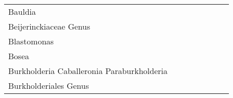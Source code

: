 \documentclass[
]{article}
\begin{document}
\begin{longtable}{@{\extracolsep{\fill}}lrrrrrrr}
Bauldia & \cellcolor[HTML]{FFF8F5}{\textcolor[HTML]{000000}{\textbf{+}}} & \cellcolor[HTML]{F2F2F2}{\textcolor[HTML]{000000}{}} & \cellcolor[HTML]{FFFFFF}{\textcolor[HTML]{000000}{\textbf{+}}} & \cellcolor[HTML]{D2B6FF}{\textcolor[HTML]{000000}{\textbf{-}}} & \cellcolor[HTML]{FFEBE4}{\textcolor[HTML]{000000}{\textbf{+}}} & \cellcolor[HTML]{FFD6C8}{\textcolor[HTML]{000000}{\textbf{+}}} & \cellcolor[HTML]{F2F2F2}{\textcolor[HTML]{000000}{}} \\ 
Beijerinckiaceae Genus & \cellcolor[HTML]{F2F2F2}{\textcolor[HTML]{000000}{}} & \cellcolor[HTML]{EFE3FF}{\textcolor[HTML]{000000}{\textbf{-}}} & \cellcolor[HTML]{FFFDFC}{\textcolor[HTML]{000000}{\textbf{+}}} & \cellcolor[HTML]{C3A0FF}{\textcolor[HTML]{000000}{\textbf{-}}} & \cellcolor[HTML]{F2F2F2}{\textcolor[HTML]{000000}{}} & \cellcolor[HTML]{FFC1AC}{\textcolor[HTML]{000000}{\textbf{+}}} & \cellcolor[HTML]{FBF7FF}{\textcolor[HTML]{000000}{\textbf{-}}} \\ 
Blastomonas & \cellcolor[HTML]{F2F2F2}{\textcolor[HTML]{000000}{}} & \cellcolor[HTML]{F2F2F2}{\textcolor[HTML]{000000}{}} & \cellcolor[HTML]{FFFFFF}{\textcolor[HTML]{000000}{\textbf{-}}} & \cellcolor[HTML]{F2F2F2}{\textcolor[HTML]{000000}{}} & \cellcolor[HTML]{F2F2F2}{\textcolor[HTML]{000000}{}} & \cellcolor[HTML]{F2F2F2}{\textcolor[HTML]{000000}{}} & \cellcolor[HTML]{F2F2F2}{\textcolor[HTML]{000000}{}} \\ 
Bosea & \cellcolor[HTML]{E2CDFF}{\textcolor[HTML]{000000}{\textbf{-}}} & \cellcolor[HTML]{D1B4FF}{\textcolor[HTML]{000000}{\textbf{-}}} & \cellcolor[HTML]{FDFCFF}{\textcolor[HTML]{000000}{\textbf{-}}} & \cellcolor[HTML]{E5D2FF}{\textcolor[HTML]{000000}{\textbf{-}}} & \cellcolor[HTML]{F2F2F2}{\textcolor[HTML]{000000}{}} & \cellcolor[HTML]{F2F2F2}{\textcolor[HTML]{000000}{}} & \cellcolor[HTML]{F2F2F2}{\textcolor[HTML]{000000}{}} \\ 
Burkholderia Caballeronia Paraburkholderia & \cellcolor[HTML]{F2F2F2}{\textcolor[HTML]{000000}{}} & \cellcolor[HTML]{F2F2F2}{\textcolor[HTML]{000000}{}} & \cellcolor[HTML]{F2F2F2}{\textcolor[HTML]{000000}{}} & \cellcolor[HTML]{F2F2F2}{\textcolor[HTML]{000000}{}} & \cellcolor[HTML]{F2F2F2}{\textcolor[HTML]{000000}{}} & \cellcolor[HTML]{F2F2F2}{\textcolor[HTML]{000000}{}} & \cellcolor[HTML]{FFFDFC}{\textcolor[HTML]{000000}{\textbf{+}}} \\ 
Burkholderiales Genus & \cellcolor[HTML]{F2F2F2}{\textcolor[HTML]{000000}{}} & \cellcolor[HTML]{F2F2F2}{\textcolor[HTML]{000000}{}} & \cellcolor[HTML]{F2F2F2}{\textcolor[HTML]{000000}{}} & \cellcolor[HTML]{F8F2FF}{\textcolor[HTML]{000000}{\textbf{-}}} & \cellcolor[HTML]{F2F2F2}{\textcolor[HTML]{000000}{}} & \cellcolor[HTML]{F2F2F2}{\textcolor[HTML]{000000}{}} & \cellcolor[HTML]{F2F2F2}{\textcolor[HTML]{000000}{}} \\ 

\end{longtable}
\end{document}
